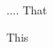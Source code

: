 \documentclass[11pt, a4paper]{article}
\begin{document}
....
That
\cite{Johnson}


This 
\end{document}
